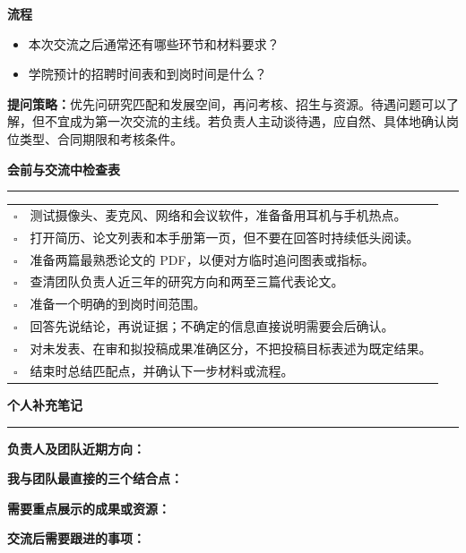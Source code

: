 \documentclass[11pt,a4paper]{ctexart}
\newcommand{\sectionbar}[1]{%
  \vspace{0.35em}
  {\large\bfseries\sffamily\color{accent} #1}\par
  \vspace{-0.35em}\color{accent}\rule{\textwidth}{0.7pt}\color{black}\vspace{0.2em}
}
\newcommand{\prompt}[1]{\textbf{\color{accent}#1}}
\newcommand{\note}[1]{%
  \begin{center}
  \colorbox{light}{\parbox{0.94\textwidth}{#1}}
  \end{center}
}
\newcommand{\blankline}{\vspace{0.6em}\hrulefill\par}
\begin{document}
\prompt{流程}
\begin{itemize}
  \item 本次交流之后通常还有哪些环节和材料要求？
  \item 学院预计的招聘时间表和到岗时间是什么？
\end{itemize}

\note{\textbf{提问策略：}优先问研究匹配和发展空间，再问考核、招生与资源。待遇问题可以了解，但不宜成为第一次交流的主线。若负责人主动谈待遇，应自然、具体地确认岗位类型、合同期限和考核条件。}

\sectionbar{会前与交流中检查表}

\begin{tabularx}{\textwidth}{p{0.7cm} X}
$\square$ & 测试摄像头、麦克风、网络和会议软件，准备备用耳机与手机热点。\\
$\square$ & 打开简历、论文列表和本手册第一页，但不要在回答时持续低头阅读。\\
$\square$ & 准备两篇最熟悉论文的 PDF，以便对方临时追问图表或指标。\\
$\square$ & 查清团队负责人近三年的研究方向和两至三篇代表论文。\\
$\square$ & 准备一个明确的到岗时间范围。\\
$\square$ & 回答先说结论，再说证据；不确定的信息直接说明需要会后确认。\\
$\square$ & 对未发表、在审和拟投稿成果准确区分，不把投稿目标表述为既定结果。\\
$\square$ & 结束时总结匹配点，并确认下一步材料或流程。\\
\end{tabularx}

\endgroup

\sectionbar{个人补充笔记}

\prompt{负责人及团队近期方向：}
\blankline\blankline

\prompt{我与团队最直接的三个结合点：}
\blankline\blankline

\prompt{需要重点展示的成果或资源：}
\blankline\blankline

\prompt{交流后需要跟进的事项：}
\blankline\blankline
\end{document}
